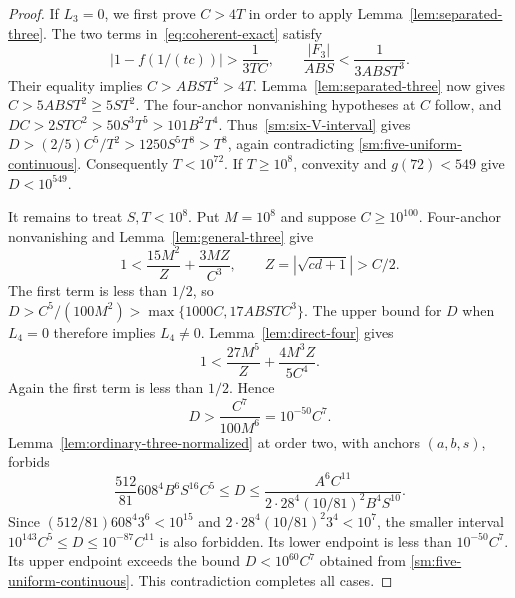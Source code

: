 \documentclass[12pt]{article}
\numberwithin{equation}{section}
\begin{document}
\begin{proof}
If $L_3=0$, we first prove $C>4T$ in order to apply
Lemma~\ref{lem:separated-three}.
The two terms in~\eqref{eq:coherent-exact} satisfy
\[
 |1-f(1/(tc))|>\frac1{3TC},\qquad
 \frac{|F_3|}{ABS}<\frac1{3ABS T^3}.
\]
Their equality implies $C>ABS T^2>4T$.
Lemma~\ref{lem:separated-three} now gives
$C>5ABS T^2\ge5ST^2$. The four-anchor nonvanishing hypotheses
at $C$ follow, and
$DC>2STC^2>50S^3T^5>101B^2T^4$.
Thus~\eqref{sm:six-V-interval} gives
$D>(2/5)C^5/T^2>1250S^5T^8>T^8$, again contradicting
\eqref{sm:five-uniform-continuous}. Consequently $T<10^{72}$.
If $T\ge10^8$, convexity and $g(72)<549$ give $D<10^{549}$.

It remains to treat $S,T<10^8$. Put $M=10^8$ and suppose
$C\ge10^{100}$. Four-anchor nonvanishing and
Lemma~\ref{lem:general-three} give
\[
 1<\frac{15M^2}{Z}+\frac{3MZ}{C^3},\qquad
 Z=|\sqrt{cd+1}|>C/2.
\]
The first term is less than $1/2$, so
$D>C^5/(100M^2)>\max\{1000C,17ABSTC^3\}$.
The upper bound for $D$ when $L_4=0$ therefore implies $L_4\ne0$.
Lemma~\ref{lem:direct-four} gives
\[
 1<\frac{27M^5}{Z}+\frac{4M^3Z}{5C^4}.
\]
Again the first term is less than $1/2$. Hence
\begin{equation}\label{sm:five-bounded-four-lower}
 D>\frac{C^7}{100M^6}=10^{-50}C^7.
\end{equation}
Lemma~\ref{lem:ordinary-three-normalized} at order two, with anchors
$(a,b,s)$, forbids
\[
 \frac{512}{81}608^4B^6S^{16}C^5\le D
 \le\frac{A^6C^{11}}{2\cdot28^4(10/81)^2B^4S^{10}}.
\]
Since $(512/81)608^4 3^6<10^{15}$ and
$2\cdot28^4(10/81)^2 3^4<10^7$, the smaller interval
$10^{143}C^5\le D\le10^{-87}C^{11}$ is also forbidden.
Its lower endpoint is less than $10^{-50}C^7$.
Its upper endpoint exceeds the bound $D<10^{60}C^7$ obtained from
\eqref{sm:five-uniform-continuous}. This contradiction completes all cases.
\end{proof}
\end{document}
